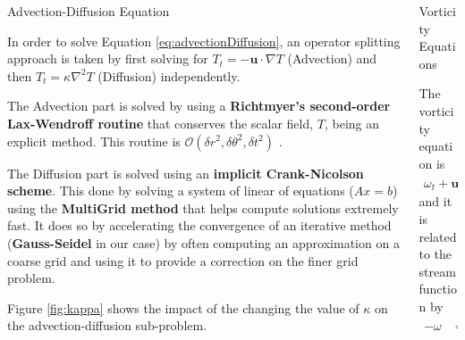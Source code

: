 \documentclass[final]{beamer}
\newlength{\onecolwid}
\newlength{\twocolwid}
\begin{document}
\begin{frame}[t]
\begin{columns}[t]
\begin{column}{\twocolwid}
\begin{columns}[t,totalwidth=\twocolwid]
\begin{column}{\onecolwid}
\begin{block}{Advection-Diffusion Equation}

In order to solve Equation \ref{eq:advectionDiffusion}, an operator splitting approach is taken by first solving for $T_t = - \textbf{u} \cdot \nabla T$ (Advection) and then $T_t = \kappa \nabla^2 T$ (Diffusion) independently.

The Advection part is solved by using a \textbf{Richtmyer's second-order Lax-Wendroff routine} that conserves the scalar field, $T$, being an explicit method. This routine is $\mathcal{O}(\delta r^2,\delta \theta^2,\delta t^2)$ \cite{Mestel}. 

The Diffusion part is solved using an \textbf{implicit Crank-Nicolson scheme}. This done by solving a system of linear of equations ($Ax=b$) using the \textbf{MultiGrid method} that helps compute solutions extremely fast. It does so by accelerating the convergence of an iterative method (\textbf{Gauss-Seidel} in our case) by often computing an approximation on a coarse grid and using it to provide a correction on the finer grid problem.

Figure \ref{fig:kappa} shows the impact of the changing the value of $\kappa$ on the advection-diffusion sub-problem.
\end{block}


\end{column} %
\begin{column}{\onecolwid} %


\begin{block}{Vorticity Equations}

The vorticity equation is 
\begin{align}
	\omega_t + \textbf{u}\cdot \nabla \omega = P_r\nabla^2\omega + P_rF
	\label{eq:omega}
\end{align}
and it is related to the stream function by 
\begin{align}
	-\omega &= \nabla^2\psi
\end{align}


\end{block}
\end{column}
\end{columns}
\end{column}
\end{columns}
\end{frame}
\end{document}
